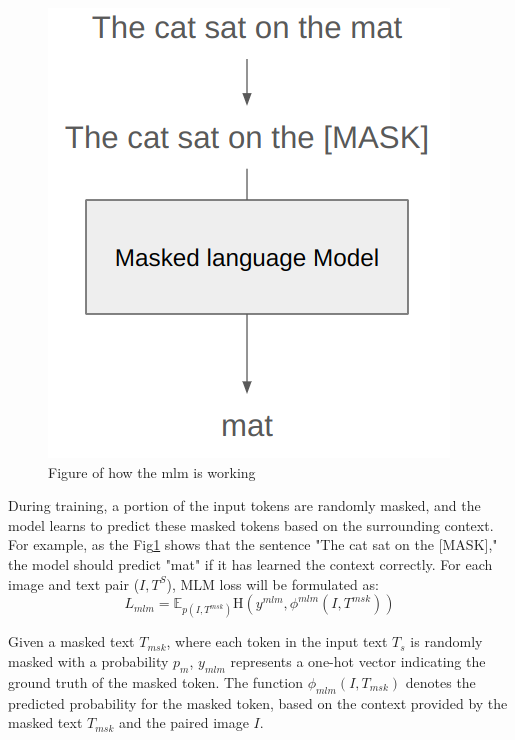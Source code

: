 \begin{figure}
  \includegraphics[width=\linewidth]{img/mlm_flow.png}
  \caption{Figure of how the mlm is working}
  \label{fig:mlm_flow}
\end{figure}

During training, a portion of the input tokens are randomly masked, and the model learns to predict these masked tokens based on the surrounding context. For example, as the Fig\ref{fig:mlm_flow} shows that the sentence "The cat sat on the [MASK]," the model should predict "mat" if it has learned the context correctly. For each image and text pair ($I,T^S$), MLM loss will be formulated as:
\[
  L_{mlm} = \mathbb{E}_{p \left( I,T^{msk}\right) }\mathrm{H}\left(y^{mlm}, \phi^{mlm}\left(I,T^{msk}\right)\right)
\]

Given a masked text \( T_{msk} \), where each token in the input text \( T_s \) is randomly masked with a probability \( p_m \), \( y_{mlm} \) represents a one-hot vector indicating the ground truth of the masked token. The function \( \phi_{mlm}(I, T_{msk}) \) denotes the predicted probability for the masked token, based on the context provided by the masked text \( T_{msk} \) and the paired image \( I \).

